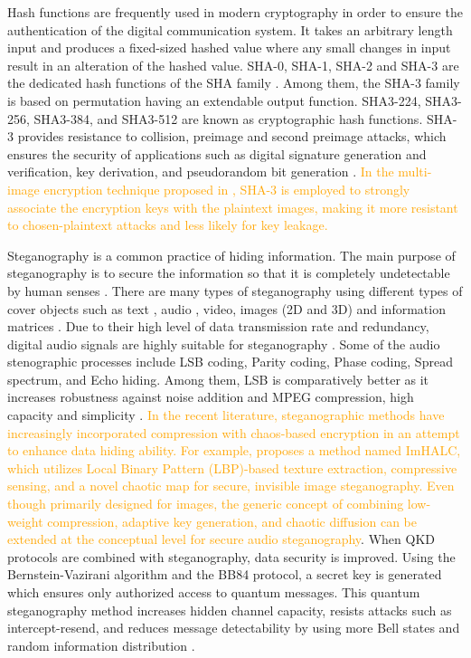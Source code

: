 \documentclass[a4paper]{cas-sc}
\begin{document}
Hash functions are frequently used in modern cryptography in order to ensure the authentication of the digital communication system. It takes an arbitrary length input and produces a fixed-sized hashed value where any small changes in input result in an alteration of the hashed value. SHA-0, SHA-1, SHA-2 and SHA-3 are the dedicated hash functions of the SHA family \cite{madhuravani2013cryptographic}. Among them, the SHA-3 family is based on permutation having an extendable output function. SHA3-224, SHA3-256, SHA3-384, and SHA3-512 are known as cryptographic hash functions. SHA-3 provides resistance to collision, preimage and second preimage attacks, which ensures the security of applications such as digital signature generation and verification, key derivation, and pseudorandom bit generation \cite{dworkin2015sha}. \textcolor{orange}{In the multi-image encryption technique proposed in \cite{hu2024multi}, SHA-3 is employed to strongly associate the encryption keys with the plaintext images, making it more resistant to chosen-plaintext attacks and less likely for key leakage.}

Steganography is a common practice of hiding information. The main purpose of steganography is to secure the information so that it is completely undetectable by human senses \cite{amin2003information}. There are many types of steganography using different types of cover objects such as text \cite{yang2018rnn}, audio \cite{jayaram2011information}\cite{hemeida2021comparative}\cite{djebbar2012comparative}, video, images (2D and 3D) \cite{farrag2020secure} and information matrices \cite{mashaly2019multiple}. Due to their high level of data transmission rate and redundancy, digital audio signals are highly suitable for steganography \cite{singh2014survey}. Some of the audio stenographic processes include LSB coding, Parity coding, Phase coding, Spread spectrum, and Echo hiding. Among them, LSB is comparatively better as it increases robustness against noise addition and MPEG compression, high capacity and simplicity \cite{cvejic2004increasing}\cite{jayaram2011information}. \textcolor{orange}{In the recent literature, steganographic methods have increasingly incorporated compression with chaos-based encryption in an attempt to enhance data hiding ability. For example, \cite{YE2025316} proposes a method named ImHALC, which utilizes Local Binary Pattern (LBP)-based texture extraction, compressive sensing, and a novel chaotic map for secure, invisible image steganography. Even though primarily designed for images, the generic concept of combining low-weight compression, adaptive key generation, and chaotic diffusion can be extended at the conceptual level for secure audio steganography}. When QKD protocols are combined with steganography, data security is improved. Using the Bernstein-Vazirani algorithm and the BB84 protocol, a secret key is generated which ensures only authorized access to quantum messages. This quantum steganography method increases hidden channel capacity, resists attacks such as intercept-resend, and reduces message detectability by using more Bell states and random information distribution \cite{yalla2022novel}.
\end{document}
